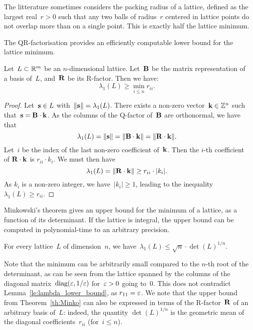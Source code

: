 The litterature sometimes considers the packing radius of a lattice, defined as the largest real~$r>0$ such that any two balls of radius~$r$ centered in lattice points do not overlap more than on a single point. This is exactly half the lattice minimum.  

The QR-factorisation provides an efficiently computable lower bound for the lattice minimum. 

\begin{lemma}
\label{le:lambda_lower_bound}
Let~$L \subset \mathbb{R}^m$ be an $n$-dimensional lattice. Let~${\bf B}$ be the matrix representation of a basis of~$L$, and~${\bf R}$ 
be its R-factor. Then we have:
\[ \lambda_1(L) \geq  \min_{i \leq n} r_{ii}.\]
\end{lemma}

\begin{proof}
Let~${\bf s} \in L$ with~$\|{\bf s}\| = \lambda_1(L)$. 
There exists a non-zero  vector~${\bf k} \in \mathbb{Z}^n$ such that~${\bf s} = {\bf B} \cdot {\bf k}$. 
As the columns of the Q-factor of~${\bf B}$ are orthonormal, we have that
\[
\lambda_1(L) = \|{\bf s}\| = \|{\bf B} \cdot {\bf k}\| = \|{\bf R} \cdot {\bf k}\|. 
\]
Let~$i$ be the index of the last non-zero coefficient of~${\bf k}$. Then the $i$-th coefficient of  ${\bf R} \cdot {\bf k}$ 
is $r_{ii} \cdot k_i$. We must then have
\[
\lambda_1(L) = \|{\bf R} \cdot {\bf k}\| \geq r_{ii} \cdot |k_i|.
\]
As $k_i$ is a non-zero integer, we have~$|k_i| \geq 1$, leading to the inequality~$\lambda_1(L) \geq r_{ii}$.
\end{proof}



Minkowski's theorem gives an upper bound for the minimum of a lattice, as a function of its determinant. If the lattice is integral, the
upper bound can be computed in polynomial-time to an arbitrary precision. 

\begin{theorem}
\label{th:Minko}
For every lattice~$L$ of dimension~$n$, we have~$\lambda_1(L) \leq \sqrt{n} \cdot \det(L)^{1/n}$.
\end{theorem}

Note that the minimum can be arbitrarily small compared to the $n$-th root of the determinant, as can be seen from the lattice
spanned by the columns of the diagonal matrix~$\mbox{diag}(\varepsilon, 1/\varepsilon)$ for~$\varepsilon>0$ going to~$0$. This does not contradict Lemma~\ref{le:lambda_lower_bound}, as $r_{11} = \varepsilon$. We note that the upper bound from Theorem~\ref{th:Minko} can 
also be expressed in terms of the R-factor~${\bf R}$  of an arbitrary basis of~$L$: 
indeed, the quantity $\det(L)^{1/n}$ is the geometric mean of the diagonal coefficients~$r_{ii}$ (for~$i \leq n$). 


